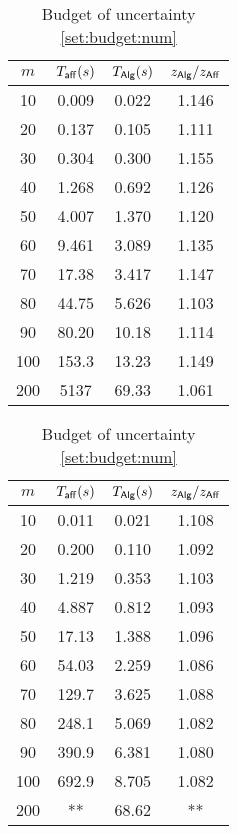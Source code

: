 \documentclass[moor]{informs1}              %
\begin{document}
\begin{table}[htp]
\begin{subtable}{0.5\linewidth}\centering
{\begin{tabular}{|c|c|c|c|}
\hline
$m$ & $T_{\sf aff}(s)$ & $T_{\sf Alg}(s)$ & $z_{\sf{Alg}}/ z_{\sf{Aff}} $ \\ \hline
10  & 0.009	&	0.022	&	1.146   \\\hline
20  & 0.137	&	0.105	&	1.111   \\\hline
30  &0.304	&	0.300	&	1.155   \\\hline
40  &1.268	&	0.692	&	1.126   \\\hline
50  &4.007	&	1.370	&	1.120   \\\hline
60  &9.461	&	3.089	&	1.135    \\\hline
70  &17.38	&	3.417	&	1.147   \\\hline
80  &44.75  &	5.626	&	1.103    \\\hline
90  &80.20	&	10.18	&	1.114   \\\hline
100  &153.3	&	13.23	&	1.149    \\\hline
200  &5137	&	69.33	&	1.061    \\\hline
\end{tabular}}
\caption{Budget of uncertainty  \eqref{set:k-ones:num}}\label{tab:U1}
\end{subtable}%
\begin{subtable}{.5\linewidth}\centering
{\begin{tabular}{|c|c|c|c|}
\hline
$m$ & $T_{\sf aff}(s)$ & $T_{\sf Alg}(s)$ &$z_{\sf{Alg}}/ z_{\sf{Aff}} $ \\ \hline
10  & 0.011 &		0.021	&	1.108   \\\hline
20  &0.200	&	0.110	&	1.092     \\\hline
30  &1.219	&0.353  &	1.103    \\\hline
40  &4.887	&	0.812	&	1.093   \\\hline
50  &17.13	&	1.388	&	1.096   \\\hline
60  &54.03	&	2.259	&	1.086   \\\hline
70  &129.7  	&3.625	&	1.088   \\\hline
80  &248.1 &		5.069	&	1.082  \\\hline
90  &390.9 &		6.381	&	1.080  \\\hline
100  &692.9& 	8.705	&	1.082 \\\hline
200  &**& 	68.62	&	** \\\hline
\end{tabular}}
\caption{Budget of uncertainty \eqref{set:budget:num}}\label{tab:U2}

\end{subtable}
\end{table}
\end{document}
